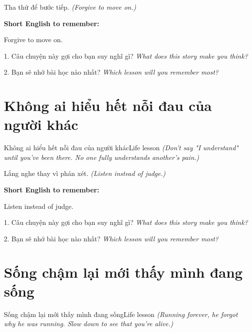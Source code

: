 \begin{baihoc}
Tha thứ để bước tiếp.
\textit{(Forgive to move on.)}
\end{baihoc}

\begin{ghinhoanh}
\textbf{Short English to remember:}

Forgive to move on.

\end{ghinhoanh}

\begin{tuhocnhanh}
1. Câu chuyện này gợi cho bạn suy nghĩ gì? \textit{What does this story make you think?}

2. Bạn sẽ nhớ bài học nào nhất? \textit{Which lesson will you remember most?}
\end{tuhocnhanh}
\ngancach


\section{Không ai hiểu hết nỗi đau của người khác}
\begin{truyen}{Không ai hiểu hết nỗi đau của người khác}{Life lesson}
\textit{(Don't say "I understand" until you've been there. No one fully understands another's pain.)}
\end{truyen}

\begin{baihoc}
Lắng nghe thay vì phán xét.
\textit{(Listen instead of judge.)}
\end{baihoc}

\begin{ghinhoanh}
\textbf{Short English to remember:}

Listen instead of judge.

\end{ghinhoanh}

\begin{tuhocnhanh}
1. Câu chuyện này gợi cho bạn suy nghĩ gì? \textit{What does this story make you think?}

2. Bạn sẽ nhớ bài học nào nhất? \textit{Which lesson will you remember most?}
\end{tuhocnhanh}
\ngancach


\section{Sống chậm lại mới thấy mình đang sống}
\begin{truyen}{Sống chậm lại mới thấy mình đang sống}{Life lesson}
\textit{(Running forever, he forgot why he was running. Slow down to see that you're alive.)}
\end{truyen}

